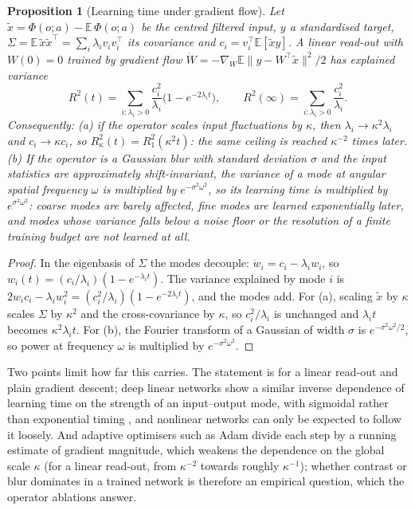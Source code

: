 \documentclass{article}
\theoremstyle{plain}
\newtheorem{proposition}{Proposition}
\theoremstyle{remark}
\begin{document}
\begin{proposition}[Learning time under gradient flow]\label{prop:time}
Let \(\tilde x=\Phi(o;a)-\mathbb E\,\Phi(o;a)\) be the centred filtered input, \(y\) a standardised target, \(\Sigma=\mathbb E\,\tilde x\tilde x^\top=\sum_i\lambda_i v_iv_i^\top\) its covariance and \(c_i=v_i^\top\mathbb E[\tilde x y]\). A linear read-out with \(W(0)=0\) trained by gradient flow \(\dot W=-\nabla_W\mathbb E\lVert y-W^\top\tilde x\rVert^2/2\) has explained variance
\begin{equation}R^2(t)=\sum_{i:\lambda_i>0}\frac{c_i^2}{\lambda_i}\Big(1-e^{-2\lambda_i t}\Big),\qquad R^2(\infty)=\sum_{i:\lambda_i>0}\frac{c_i^2}{\lambda_i}.\label{eq:r2t}\end{equation}
Consequently: (a) if the operator scales input fluctuations by \(\kappa\), then \(\lambda_i\to\kappa^2\lambda_i\) and \(c_i\to\kappa c_i\), so \(R^2_\kappa(t)=R^2_1(\kappa^2t)\): the same ceiling is reached \(\kappa^{-2}\) times later. (b) If the operator is a Gaussian blur with standard deviation \(\sigma\) and the input statistics are approximately shift-invariant, the variance of a mode at angular spatial frequency \(\omega\) is multiplied by \(e^{-\sigma^2\omega^2}\), so its learning time is multiplied by \(e^{\sigma^2\omega^2}\): coarse modes are barely affected, fine modes are learned exponentially later, and modes whose variance falls below a noise floor or the resolution of a finite training budget are not learned at all.
\end{proposition}

\begin{proof}
In the eigenbasis of \(\Sigma\) the modes decouple: \(\dot w_i=c_i-\lambda_iw_i\), so \(w_i(t)=(c_i/\lambda_i)(1-e^{-\lambda_it})\). The variance explained by mode \(i\) is \(2w_ic_i-\lambda_iw_i^2=(c_i^2/\lambda_i)(1-e^{-2\lambda_it})\), and the modes add. For (a), scaling \(\tilde x\) by \(\kappa\) scales \(\Sigma\) by \(\kappa^2\) and the cross-covariance by \(\kappa\), so \(c_i^2/\lambda_i\) is unchanged and \(\lambda_it\) becomes \(\kappa^2\lambda_it\). For (b), the Fourier transform of a Gaussian of width \(\sigma\) is \(e^{-\sigma^2\omega^2/2}\), so power at frequency \(\omega\) is multiplied by \(e^{-\sigma^2\omega^2}\).
\end{proof}

Two points limit how far this carries. The statement is for a linear read-out and plain gradient descent; deep linear networks show a similar inverse dependence of learning time on the strength of an input--output mode, with sigmoidal rather than exponential timing \autocite{saxe2019mathematical}, and nonlinear networks can only be expected to follow it loosely. And adaptive optimisers such as Adam \autocite{kingma2015adam} divide each step by a running estimate of gradient magnitude, which weakens the dependence on the global scale \(\kappa\) (for a linear read-out, from \(\kappa^{-2}\) towards roughly \(\kappa^{-1}\)); whether contrast or blur dominates in a trained network is therefore an empirical question, which the operator ablations answer.
\end{document}
